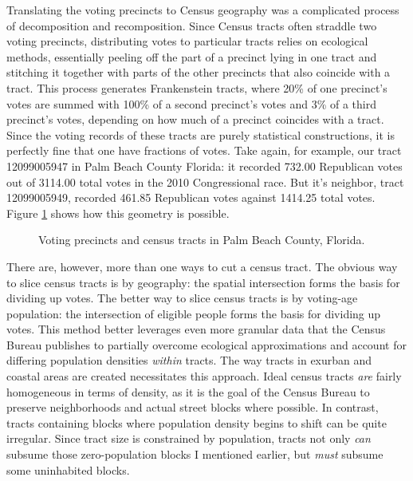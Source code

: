 \documentclass[12pt,oneside]{psthesis}
\begin{document}
Translating the voting precincts to Census geography was a complicated process of decomposition and recomposition.
Since Census tracts often straddle two voting precincts, distributing votes to particular tracts relies on ecological methods, essentially peeling off the part of a precinct lying in one tract and stitching it together with parts of the other precincts that also coincide with a tract.
This process generates Frankenstein tracts, where 20\% of one precinct's votes are summed with 100\% of a second precinct's votes and 3\% of a third precinct's votes, depending on how much of a precinct coincides with a tract.
Since the voting records of these tracts are purely statistical constructions, it is perfectly fine that one have fractions of votes.
Take again, for example, our tract 12099005947 in Palm Beach County Florida: it recorded 732.00 Republican votes out of 3114.00 total votes in the 2010 Congressional race.
But it's neighbor, tract 12099005949, recorded 461.85 Republican votes against 1414.25 total votes.
Figure \ref{fig:palmbeach} shows how this geometry is possible.
\begin{figure}

{\centering {}

}

\caption{Voting precincts and census tracts in Palm Beach County, Florida.}\label{fig:palmbeach}
\end{figure}
There are, however, more than one ways to cut a census tract.
The obvious way to slice census tracts is by geography: the spatial intersection forms the basis for dividing up votes.
The better way to slice census tracts is by voting-age population: the intersection of eligible people forms the basis for dividing up votes.
This method better leverages even more granular data that the Census Bureau publishes to partially overcome ecological approximations and account for differing population densities \emph{within} tracts.
The way tracts in exurban and coastal areas are created necessitates this approach.
Ideal census tracts \emph{are} fairly homogeneous in terms of density, as it is the goal of the Census Bureau to preserve neighborhoods and actual street blocks where possible.
In contrast, tracts containing blocks where population density begins to shift can be quite irregular.
Since tract size is constrained by population, tracts not only \emph{can} subsume those zero-population blocks I mentioned earlier, but \emph{must} subsume some uninhabited blocks.
\end{document}
